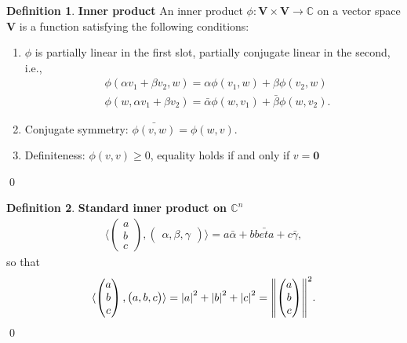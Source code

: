 \documentclass{book}
\theoremstyle{definition}
\newtheorem{defn}{Definition}[section]
\newcommand{\C}{\mathbb{C}}
\newcommand{\V}{\mathbf{V}}
\newcommand{\la}{\langle}
\newcommand{\ra}{\rangle}
\begin{document}


\begin{defn}\textbf{Inner product}
	An inner product $\phi: \V \times \V \to \C$ on a vector space $\V$ is a function satisfying the following conditions:
	\begin{enumerate}
		\item $\phi$ is partially linear in the first slot, partially conjugate linear in the second, i.e.,
		\begin{align*}
		&\phi(\alpha v_1 + \beta v_2, w) = \alpha \phi(v_1, w) + \beta\phi(v_2,w)\\
		&\phi(w,\alpha v_1 + \beta v_2) = \bar{\alpha}\phi(w,v_1)+ \bar{\beta}\phi(w,v_2).
		\end{align*} 
		\item Conjugate symmetry: $\bar{\phi(v,w)} = \phi(w,v)$.
		\item Definiteness: $\phi(v,v) \geq 0$, equality holds if and only if $v = \mathbf{0}$
	\end{enumerate}\qed
\end{defn}



\begin{defn}\textbf{Standard inner product on $\C^n$}
	\begin{align*}
	\la \begin{pmatrix}
	a\\b\\c
	\end{pmatrix}, \begin{pmatrix}
	\alpha,\beta,\gamma
	\end{pmatrix} \ra = a\bar{\alpha} + b\bar{beta} + c\bar{\gamma},
	\end{align*}
	so that 
	\begin{align*}
	\la \begin{pmatrix}
	a\\b\\c
	\end{pmatrix}, \begin{pmatrix}
	a,b,c
	\end{pmatrix} \ra = \abs{a}^2 + \abs{b}^2 + \abs{c}^2 = \norm{\begin{pmatrix}
		a\\b\\c
		\end{pmatrix}}^2.
	\end{align*}
	\qed
\end{defn}
\end{document}
